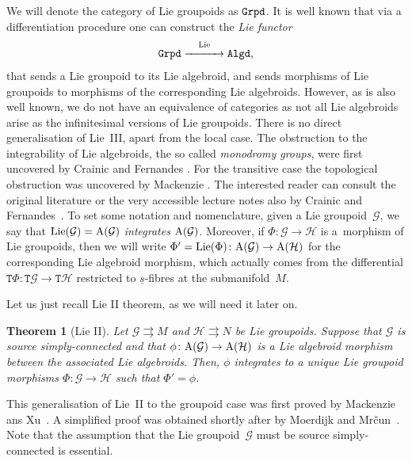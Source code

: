 \documentclass[10pt,a4paper]{amsart}
\newcommand{\rmA}{\textnormal{A}}
\newcommand{\Lie}{\textnormal{Lie}}
\newcommand{\catname}[1]{\textnormal{\texttt{#1}}}
\def\sT{{\mathtt T}}
\numberwithin{equation}{section}
\newtheorem{Theorem}{Theorem}[section]
\begin{document}
We will denote the category of Lie groupoids as $\catname{Grpd}$. It is well known that via a dif\/fe\-ren\-tia\-tion procedure one can construct the \emph{Lie functor}
\begin{gather*}
\catname{Grpd} \stackrel{\Lie}{\xrightarrow{\hspace*{30pt}}} \catname{Algd},
\end{gather*}
that sends a Lie groupoid to its Lie algebroid, and sends morphisms of Lie groupoids to morphisms of the corresponding Lie algebroids. However, as is also well known, we do not have an equivalence of categories as not all Lie  algebroids arise as the inf\/initesimal versions of Lie groupoids.  There is no direct generalisation of Lie~III,  apart from the local case. The obstruction to the integrability of Lie algebroids, the so called \emph{monodromy groups},  were f\/irst uncovered by Crainic and Fernandes \cite{Crainic:2003}.  For the transitive case the topological obstruction was uncovered by Mackenzie \cite{Mackenzie:1987}.  The interested reader can consult the original literature or the very accessible lecture notes also by Crainic and  Fernandes~\cite{Crainic:2011}. To set some notation and nomenclature, given a  Lie groupoid~$\mathcal{G}$, we say that $\Lie(\mathcal{G}) = \rmA(\mathcal{G})$ \emph{integrates}  $\rmA(\mathcal{G})$. Moreover, if $\Phi\colon \mathcal{G} \rightarrow \mathcal{H}$ is a~morphism of Lie groupoids, then we will write $\Phi' = \Lie(\Phi) \colon  \rmA(\mathcal{G}) \rightarrow \rmA(\mathcal{H})$ for the corresponding Lie algebroid morphism,  which actually comes from the dif\/ferential $\sT\Phi\colon \sT\mathcal{G} \rightarrow \sT\mathcal{H}$ restricted to $\underline{s}$-f\/ibres at the submanifold~$M$.

Let  us just recall Lie II theorem, as we will need it later on.

\begin{Theorem}[Lie II] \label{thm:integration morphisms}
Let $\mathcal{G} \rightrightarrows M$ and $\mathcal{H}\rightrightarrows N$ be Lie groupoids. Suppose that $\mathcal{G}$ is source simply-connected and that $\phi\colon \rmA(\mathcal{G}) \rightarrow \rmA(\mathcal{H})$ is a Lie algebroid morphism between the associated Lie algebroids. Then, $\phi$ integrates to a unique Lie groupoid morphisms $\Phi\colon \mathcal{G} \rightarrow \mathcal{H}$ such that $\Phi' = \phi$.
\end{Theorem}

This generalisation  of Lie~II to the groupoid case was f\/irst proved by Mackenzie ans Xu~\cite{Mackenzie:2000}. A simplif\/ied proof was obtained shortly after by Moerdijk and  Mr\v{c}un~\cite{Moerdijk:2002}.  Note that the assumption that the Lie groupoid~$\mathcal{G}$ must be source simply-connected is essential.
\end{document}
